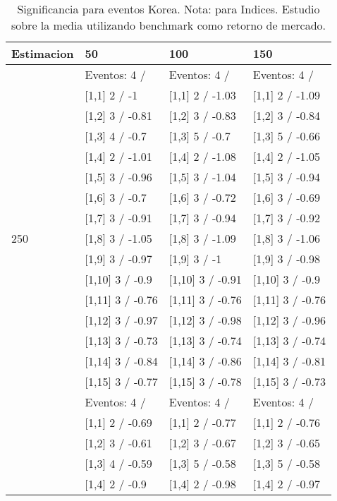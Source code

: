 \begin{table}

\caption{Significancia para eventos Korea. Nota: para Indices. Estudio sobre la media utilizando benchmark como retorno de mercado.}
\centering
\begin{tabular}[t]{llll}
\toprule
Estimacion & 50 & 100 & 150\\
\midrule
 & Eventos:  4 / & Eventos:  4 / & Eventos:  4 /\\
 & {}[1,1] 2  / -1 & {}[1,1] 2  / -1.03 & {}[1,1] 2  / -1.09\\
 & {}[1,2] 3  / -0.81 & {}[1,2] 3  / -0.83 & {}[1,2] 3  / -0.84\\
 & {}[1,3] 4  / -0.7 & {}[1,3] 5  / -0.7 & {}[1,3] 5  / -0.66\\
 & {}[1,4] 2  / -1.01 & {}[1,4] 2  / -1.08 & {}[1,4] 2  / -1.05\\
\addlinespace
 & {}[1,5] 3  / -0.96 & {}[1,5] 3  / -1.04 & {}[1,5] 3  / -0.94\\
 & {}[1,6] 3  / -0.7 & {}[1,6] 3  / -0.72 & {}[1,6] 3  / -0.69\\
 & {}[1,7] 3  / -0.91 & {}[1,7] 3  / -0.94 & {}[1,7] 3  / -0.92\\
250 & {}[1,8] 3  / -1.05 & {}[1,8] 3  / -1.09 & {}[1,8] 3  / -1.06\\
 & {}[1,9] 3  / -0.97 & {}[1,9] 3  / -1 & {}[1,9] 3  / -0.98\\
\addlinespace
 & {}[1,10] 3  / -0.9 & {}[1,10] 3  / -0.91 & {}[1,10] 3  / -0.9\\
 & {}[1,11] 3  / -0.76 & {}[1,11] 3  / -0.76 & {}[1,11] 3  / -0.76\\
 & {}[1,12] 3  / -0.97 & {}[1,12] 3  / -0.98 & {}[1,12] 3  / -0.96\\
 & {}[1,13] 3  / -0.73 & {}[1,13] 3  / -0.74 & {}[1,13] 3  / -0.74\\
 & {}[1,14] 3  / -0.84 & {}[1,14] 3  / -0.86 & {}[1,14] 3  / -0.81\\
\addlinespace
 & {}[1,15] 3  / -0.77 & {}[1,15] 3  / -0.78 & {}[1,15] 3  / -0.73\\
 & Eventos:  4 / & Eventos:  4 / & Eventos:  4 /\\
 & {}[1,1] 2  / -0.69 & {}[1,1] 2  / -0.77 & {}[1,1] 2  / -0.76\\
 & {}[1,2] 3  / -0.61 & {}[1,2] 3  / -0.67 & {}[1,2] 3  / -0.65\\
 & {}[1,3] 4  / -0.59 & {}[1,3] 5  / -0.58 & {}[1,3] 5  / -0.58\\
\addlinespace
 & {}[1,4] 2  / -0.9 & {}[1,4] 2  / -0.98 & {}[1,4] 2  / -0.97\\

\end{tabular}
\end{table}

